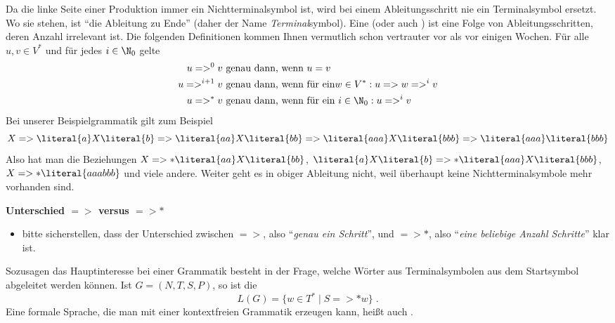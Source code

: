 Da die linke Seite einer Produktion immer ein Nichtterminalsymbol ist,
wird bei einem Ableitungsschritt nie ein Terminalsymbol ersetzt. Wo
sie stehen, ist "`die Ableitung zu Ende"' (daher der Name
\emph{Terminal}symbol). Eine 
(oder auch ) ist eine
Folge von Ableitungsschritten, deren Anzahl irrelevant ist. Die
folgenden Definitionen kommen Ihnen vermutlich schon vertrauter vor
als vor einigen Wochen. Für alle $u,v\in V^*$ und für jedes
$i\in \N_0$ gelte
%
\begin{align*}
  u =>^0 v &\text{ genau dann, wenn } u=v \\
  u =>^{i+1} v &\text{ genau dann, wenn für ein}  w\in V^*: u => w =>^i v\\
  u =>^* v &\text{ genau dann, wenn für ein } i\in\N_0: u =>^i v \\
\end{align*}
%
Bei unserer Beispielgrammatik gilt zum Beispiel
\[
X => \literal{a}X\literal{b} 
=> \literal{aa}X\literal{bb}
=> \literal{aaa}X\literal{bbb}
=> \literal{aaa}\literal{bbb}
\]
%
Also hat man \zB die Beziehungen $X=>*\literal{aa}X\literal{bb}$,
$\literal{a}X\literal{b}=>* \literal{aaa}X\literal{bbb}$, $X =>*
\literal{aaabbb}$ und viele andere.  Weiter geht es in obiger
Ableitung nicht, weil überhaupt keine Nichtterminalsymbole mehr
vorhanden sind.
%
\begin{tutorium}
  \noindent
  \textbf{Unterschied $=>$ versus $=>*$}
  \begin{itemize}
  \item bitte sicherstellen, dass der Unterschied zwischen $=>$, also
    "`\emph{genau ein Schritt}"', und $=>*$, also "`\emph{eine
      beliebige Anzahl Schritte}"' klar ist.
  \end{itemize}
\end{tutorium}

Sozusagen das Hauptinteresse bei einer Grammatik besteht in der Frage,
welche Wörter aus Terminalsymbolen aus dem Startsymbol abgeleitet
werden können. Ist $G=(N,T,S,P)$, so ist die 
\[
L(G) = \{ w \in T^* \mid S =>* w \} \;.
\]
Eine formale Sprache, die man mit einer kontextfreien Grammatik
erzeugen kann, heißt auch %
.

